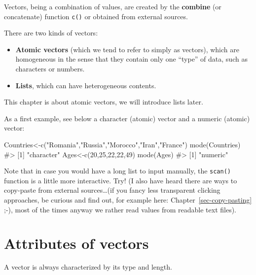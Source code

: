 \documentclass[
  letterpaper,
  DIV=11,
  numbers=noendperiod]{scrreprt}
\newenvironment{Shaded}{\begin{snugshade}}{\end{snugshade}}
\newcommand{\CommentTok}[1]{\textcolor[rgb]{0.37,0.37,0.37}{#1}}
\newcommand{\DecValTok}[1]{\textcolor[rgb]{0.68,0.00,0.00}{#1}}
\newcommand{\FunctionTok}[1]{\textcolor[rgb]{0.28,0.35,0.67}{#1}}
\newcommand{\NormalTok}[1]{\textcolor[rgb]{0.00,0.23,0.31}{#1}}
\newcommand{\OtherTok}[1]{\textcolor[rgb]{0.00,0.23,0.31}{#1}}
\newcommand{\StringTok}[1]{\textcolor[rgb]{0.13,0.47,0.30}{#1}}
\begin{document}
Vectors, being a combination of values, are created by the
\textbf{combine} (or concatenate) function \texttt{c()} or obtained from
external sources.

There are two kinds of vectors:

\begin{itemize}
\item
  \textbf{Atomic vectors} (which we tend to refer to simply as vectors),
  which are homogeneous in the sense that they contain only one ``type''
  of data, such as characters or numbers.
\item
  \textbf{Lists}, which can have heterogeneous contents.
\end{itemize}

This chapter is about atomic vectors, we will introduce lists later.

As a first example, see below a character (atomic) vector and a numeric
(atomic) vector:

\begin{Shaded}
\begin{Highlighting}[]
\NormalTok{Countries}\OtherTok{\textless{}{-}}\FunctionTok{c}\NormalTok{(}\StringTok{"Romania"}\NormalTok{,}\StringTok{"Russia"}\NormalTok{,}\StringTok{"Morocco"}\NormalTok{,}\StringTok{"Iran"}\NormalTok{,}\StringTok{"France"}\NormalTok{)}
\FunctionTok{mode}\NormalTok{(Countries)}
\CommentTok{\#\textgreater{} [1] "character"}
\NormalTok{Ages}\OtherTok{\textless{}{-}}\FunctionTok{c}\NormalTok{(}\DecValTok{20}\NormalTok{,}\DecValTok{25}\NormalTok{,}\DecValTok{22}\NormalTok{,}\DecValTok{22}\NormalTok{,}\DecValTok{49}\NormalTok{)}
\FunctionTok{mode}\NormalTok{(Ages)}
\CommentTok{\#\textgreater{} [1] "numeric"}
\end{Highlighting}
\end{Shaded}

Note that in case you would have a long list to input manually, the
\texttt{scan()} function is a little more interactive. Try! (I also have
heard there are ways to copy-paste from external sources\ldots(if you
fancy less transparent clicking approaches, be curious and find out, for
example here: Chapter~\ref{sec-copy-pasting} ;-), most of the times
anyway we rather read values from readable text files).

\section{Attributes of vectors}\label{attributes-of-vectors}

A vector is always characterized by its type and length.
\end{document}
